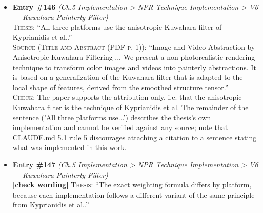 \documentclass[11pt, a4paper]{article}
\begin{document}
\begin{itemize}[leftmargin=1.2em,itemsep=4pt]
\textsc{Thesis:} ``The anisotropic Kuwahara formulation aligns an elliptical sampling window with local image structure rather than with the fixed rectangular subregions of the classical filter.''\\
\textsc{Source (Section 2 'Related Work' (PDF p. 2) and Section 3.2 'Anisotropic Kuwahara Filtering' (PDF p. 4)):} ``The Kuwahara and Tomita-Tsuji filter use rectangular subregions, while the Nagao-Matsuyama filter uses a rotated elongated bar mask. The use of rectangular subregions results in visible artifacts in the output. ... [Section 3.2] ... defines an ellipse, whose major axis is aligned to the local image orientation.''\\
\textsc{Check:} The paper states that the classical Kuwahara filter uses rectangular subregions and that the proposed method instead defines an ellipse aligned to local image orientation, matching both halves of the contrast the thesis draws. Figure 3's caption reinforces this: '(a) Rectangular subregions ... (c) Anisotropic filter shape derived from the local structure and divided into subregions'.
\item \textbf{Entry \#146} \textit{(Ch.5 Implementation > NPR Technique Implementation > V6 — Kuwahara Painterly Filter)}\\
\textsc{Thesis:} ``All three platforms use the anisotropic Kuwahara filter of Kyprianidis et al..''\\
\textsc{Source (Title and Abstract (PDF p. 1)):} ``Image and Video Abstraction by Anisotropic Kuwahara Filtering ... We present a non-photorealistic rendering technique to transform color images and videos into painterly abstractions. It is based on a generalization of the Kuwahara filter that is adapted to the local shape of features, derived from the smoothed structure tensor.''\\
\textsc{Check:} The paper supports the attribution only, i.e. that the anisotropic Kuwahara filter is the technique of Kyprianidis et al. The remainder of the sentence ('All three platforms use...') describes the thesis's own implementation and cannot be verified against any source; note that CLAUDE.md 5.1 rule 5 discourages attaching a citation to a sentence stating what was implemented in this work.
\item \textbf{Entry \#147} \textit{(Ch.5 Implementation > NPR Technique Implementation > V6 — Kuwahara Painterly Filter)}\\
\textcolor{partialorange}{\textbf{[check wording]}} \textsc{Thesis:} ``The exact weighting formula differs by platform, because each implementation follows a different variant of the same principle from Kyprianidis et al..''\\

\end{itemize}
\end{document}
